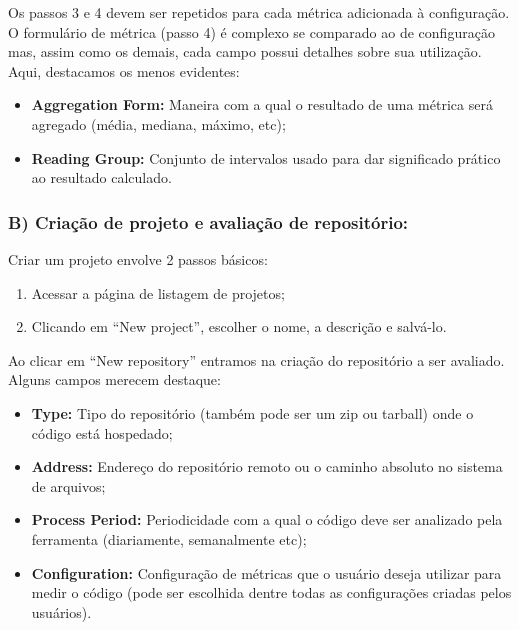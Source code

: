 \documentclass{llncs}
\begin{document}
  Os passos 3 e 4 devem ser repetidos para cada métrica adicionada à
configuração. O formulário de métrica (passo 4) é complexo se comparado ao de
configuração mas, assim como os demais, cada campo possui detalhes sobre sua
utilização. Aqui, destacamos os menos evidentes:

  \begin{itemize}
    \item \textbf{Aggregation Form:} Maneira com a qual o resultado de uma métrica será agregado (média, mediana, máximo, etc);
    \item \textbf{Reading Group:} Conjunto de intervalos usado para dar significado prático ao resultado calculado.
  \end{itemize}

  \subsubsection{B) Criação de projeto e avaliação de repositório:}

  Criar um projeto envolve 2 passos básicos:
  \begin{enumerate}
    \item Acessar a página de listagem de projetos;
    \item Clicando em ``New project'', escolher o nome, a descrição e salvá-lo.
  \end{enumerate}

  Ao clicar em ``New repository'' entramos na criação do repositório a ser
avaliado. Alguns campos merecem destaque:

  \begin{itemize}
    \item\textbf{Type:} Tipo do repositório (também pode ser um zip ou tarball) onde o código está hospedado;
    \item\textbf{Address:} Endereço do repositório remoto ou o caminho absoluto no sistema de arquivos;
    \item\textbf{Process Period:} Periodicidade com a qual o código deve ser analizado pela ferramenta (diariamente, semanalmente etc);
    \item\textbf{Configuration:} Configuração de métricas que o usuário deseja utilizar para medir o código (pode ser escolhida dentre todas as configurações criadas pelos usuários).
  \end{itemize}
\end{document}
